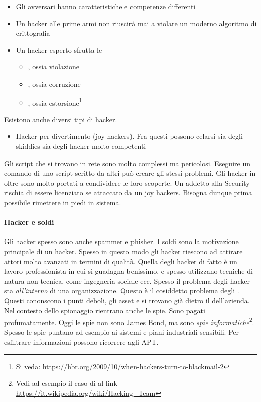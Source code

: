 \documentclass[14pt]{extreport}
\begin{document}
\begin{itemize}
    \item Gli avversari hanno caratteristiche e competenze differenti
    \item Un hacker alle prime armi non riuscirà mai a violare un moderno algoritmo di crittografia
    \item Un hacker esperto sfrutta le 
    \begin{itemize}
        \item {}, ossia violazione
        \item {}, ossia corruzione
        \item {}, ossia estorsione\footnote{Si veda: \url{https://hbr.org/2009/10/when-hackers-turn-to-blackmail-2}}
    \end{itemize}

\end{itemize}

Esistono anche diversi tipi di hacker.

\begin{itemize}
    \item Hacker per divertimento (joy hackers). Fra questi possono celarsi sia degli skiddies sia degli hacker molto competenti
\end{itemize}

Gli script che si trovano in rete sono molto complessi ma pericolosi. Eseguire un comando di uno script scritto da altri può creare gli stessi problemi. Gli hacker in oltre sono molto portati a condividere le loro scoperte.
Un addetto alla Security rischia di essere licenziato se attaccato da un joy hackers. Bisogna dunque prima possibile rimettere in piedi in sistema.

\paragraph{Hacker e soldi}
Gli hacker spesso sono anche spammer e phisher. I soldi sono la motivazione principale di un hacker. Spesso in questo modo gli hacker riescono ad attirare attori molto avanzati in termini di qualità. Quella degli hacker di fatto è un lavoro professionista in cui si guadagna benissimo, e spesso utilizzano tecniche di natura non tecnica, come ingegneria sociale ecc.
Spesso il problema degli hacker sta \textit{all'interno} di una organizzazione. Questo è il cosiddetto problema degli . Questi cononscono i punti deboli, gli asset e si trovano già dietro il  dell'azienda.
Nel contesto dello spionaggio rientrano anche le spie. Sono pagati profumatamente. Oggi le spie non sono James Bond, ma sono \textit{spie informatiche}\footnote{Vedi ad esempio il caso di  al link \url{https://it.wikipedia.org/wiki/Hacking_Team}}. Spesso le spie puntano ad esempio ai sistemi e piani industriali sensibili. Per esfiltrare informazioni possono ricorrere agli APT. 
\end{document}
